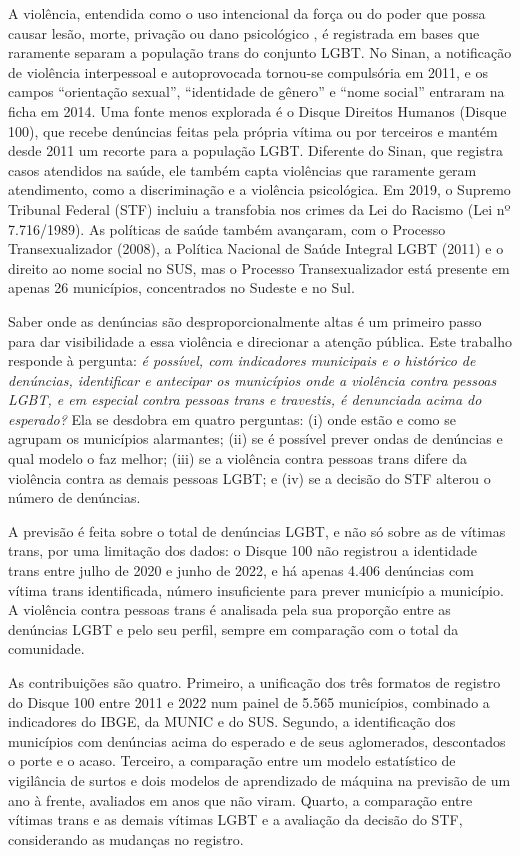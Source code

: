 \documentclass[12pt]{article}
\begin{document}
A violência, entendida como o uso intencional da força ou do poder que possa causar lesão, morte, privação ou dano psicológico \cite{marinho_tomazelli_firianelli:2024}, é registrada em bases que raramente separam a população trans do conjunto LGBT. No Sinan, a notificação de violência interpessoal e autoprovocada tornou-se compulsória em 2011, e os campos ``orientação sexual'', ``identidade de gênero'' e ``nome social'' entraram na ficha em 2014. Uma fonte menos explorada é o Disque Direitos Humanos (Disque 100), que recebe denúncias feitas pela própria vítima ou por terceiros e mantém desde 2011 um recorte para a população LGBT. Diferente do Sinan, que registra casos atendidos na saúde, ele também capta violências que raramente geram atendimento, como a discriminação e a violência psicológica. Em 2019, o Supremo Tribunal Federal (STF) incluiu a transfobia nos crimes da Lei do Racismo (Lei nº 7.716/1989). As políticas de saúde também avançaram, com o Processo Transexualizador (2008), a Política Nacional de Saúde Integral LGBT (2011) e o direito ao nome social no SUS, mas o Processo Transexualizador está presente em apenas 26 municípios, concentrados no Sudeste e no Sul.

Saber onde as denúncias são desproporcionalmente altas é um primeiro passo para dar visibilidade a essa violência e direcionar a atenção pública. Este trabalho responde à pergunta: \textit{é possível, com indicadores municipais e o histórico de denúncias, identificar e antecipar os municípios onde a violência contra pessoas LGBT, e em especial contra pessoas trans e travestis, é denunciada acima do esperado?} Ela se desdobra em quatro perguntas: (i) onde estão e como se agrupam os municípios alarmantes; (ii) se é possível prever ondas de denúncias e qual modelo o faz melhor; (iii) se a violência contra pessoas trans difere da violência contra as demais pessoas LGBT; e (iv) se a decisão do STF alterou o número de denúncias.

A previsão é feita sobre o total de denúncias LGBT, e não só sobre as de vítimas trans, por uma limitação dos dados: o Disque 100 não registrou a identidade trans entre julho de 2020 e junho de 2022, e há apenas 4.406 denúncias com vítima trans identificada, número insuficiente para prever município a município. A violência contra pessoas trans é analisada pela sua proporção entre as denúncias LGBT e pelo seu perfil, sempre em comparação com o total da comunidade.

As contribuições são quatro. Primeiro, a unificação dos três formatos de registro do Disque 100 entre 2011 e 2022 num painel de 5.565 municípios, combinado a indicadores do IBGE, da MUNIC e do SUS. Segundo, a identificação dos municípios com denúncias acima do esperado e de seus aglomerados, descontados o porte e o acaso. Terceiro, a comparação entre um modelo estatístico de vigilância de surtos e dois modelos de aprendizado de máquina na previsão de um ano à frente, avaliados em anos que não viram. Quarto, a comparação entre vítimas trans e as demais vítimas LGBT e a avaliação da decisão do STF, considerando as mudanças no registro.
\end{document}
